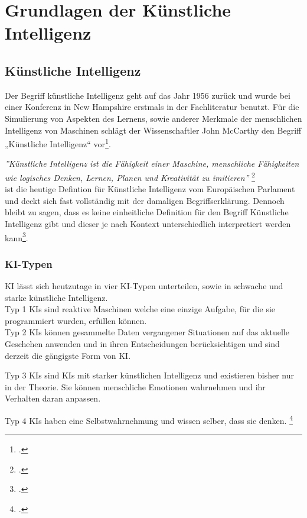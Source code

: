 \chapter{Grundlagen der Künstliche Intelligenz\label{cha:chapter2}}

\section{Künstliche Intelligenz\label{sec:bb}}

Der Begriff künstliche Intelligenz geht auf das Jahr 1956 zurück
und wurde bei einer 
Konferenz in New Hampshire erstmals in der Fachliteratur benutzt. 
Für die Simulierung von Aspekten des 
Lernens, sowie anderer Merkmale der menschlichen Intelligenz von 
Maschinen schlägt der Wissenschaftler John McCarthy den Begriff 
„Künstliche Intelligenz“ vor\footcite{WhatAIBasic}. 


\textit{''Künstliche Intelligenz ist die Fähigkeit einer Maschine, 
menschliche Fähigkeiten wie logisches Denken, Lernen, Planen und 
Kreativität zu imitieren''} \footcite{WasIstKuenstliche2020}\\
ist die heutige Defintion für Künstliche Intelligenz vom Europäischen Parlament 
und deckt sich fast vollständig mit der damaligen Begriffserklärung. Dennoch
bleibt zu sagen, dass es keine einheitliche Definition für den 
Begriff Künstliche Intelligenz gibt und dieser je nach Kontext
unterschiedlich interpretiert werden kann\footcite{WasIstKuenstliche20}.

\subsection{KI-Typen}
KI lässt sich heutzutage in vier KI-Typen unterteilen, 
sowie in schwache und starke künstliche Intelligenz.
\\

Typ 1 KIs sind reaktive 
Maschinen welche eine einzige Aufgabe, für die sie programmiert wurden, 
erfüllen können.
\\

Typ 2 KIs können gesammelte Daten vergangener 
Situationen auf das aktuelle Geschehen anwenden und 
in ihren Entscheidungen berücksichtigen und sind derzeit die gängigste Form von KI.

Typ 3 KIs sind KIs mit starker künstlichen Intelligenz und 
existieren bisher nur in der Theorie. 
Sie können menschliche Emotionen wahrnehmen und ihr Verhalten daran anpassen.

Typ 4 KIs haben eine Selbstwahrnehmung und wissen selber, dass sie denken. 
\footcite{stadlerKuenstlicheIntelligenz}


